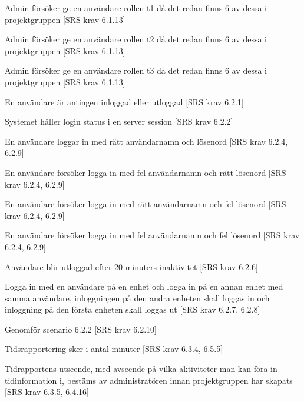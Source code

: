 \documentclass[a4paper]{article}
\begin{document}
\begin{appendices}
\begin{FT}
\item
Admin försöker ge en användare rollen t1 då det redan finns 6 av dessa i projektgruppen [SRS krav 6.1.13]

\item
Admin försöker ge en användare rollen t2 då det redan finns 6 av dessa i projektgruppen [SRS krav 6.1.13]

\item
Admin försöker ge en användare rollen t3 då det redan finns 6 av dessa i projektgruppen [SRS krav 6.1.13]

\item
En användare är antingen inloggad eller utloggad [SRS krav 6.2.1]

\item
Systemet håller login status i en server session [SRS krav 6.2.2]

\item
En användare loggar in med rätt användarnamn och lösenord [SRS krav 6.2.4, 6.2.9]

\item
En användare försöker logga in med fel användarnamn och rätt lösenord [SRS krav 6.2.4, 6.2.9]

\item
En användare försöker logga in med rätt användarnamn och fel lösenord [SRS krav 6.2.4, 6.2.9]

\item
En användare försöker logga in med fel användarnamn och fel lösenord [SRS krav 6.2.4, 6.2.9]

\item 
Användare blir utloggad efter 20 minuters inaktivitet [SRS krav 6.2.6]

\item 
Logga in med en användare på en enhet och logga in på en annan enhet med samma användare, inloggningen på den andra enheten skall loggas in och inloggning på den första enheten skall loggas ut [SRS krav 6.2.7, 6.2.8]

\item
Genomför scenario 6.2.2 [SRS krav 6.2.10]

\item
Tidsrapportering sker i antal minuter [SRS krav 6.3.4, 6.5.5]

\item
Tidrapportens utseende, med avseende på vilka aktiviteter man kan föra in tidinformation i, bestäms av administratören innan projektgruppen har skapats [SRS krav 6.3.5, 6.4.16]


\end{FT}
\end{appendices}
\end{document}
